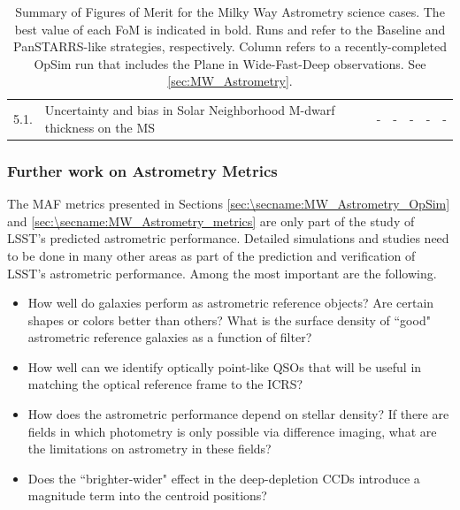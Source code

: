 \begin{table}
\begin{tabular}{l|p{4.8cm}|p{1.1cm}|p{1.1cm}|p{1.1cm}|c|p{3.5cm}}
    5.1. & \footnotesize{Uncertainty and bias in Solar Neighborhood M-dwarf thickness on the MS}  & - & - & - & - &  - \\
\end{tabular}
\caption{Summary of Figures of Merit for the Milky Way Astrometry science cases. The best value of each FoM is indicated in bold. Runs  and  refer to the Baseline and PanSTARRS-like strategies, respectively. Column  refers to a recently-completed OpSim run that includes the Plane in Wide-Fast-Deep observations. See \autoref{sec:MW_Astrometry}.}
\label{tab_SummaryMWAstrometry}
\end{table}




\subsubsection{Further work on Astrometry Metrics}

The MAF metrics presented in Sections \ref{sec:\secname:MW_Astrometry_OpSim} and \ref{sec:\secname:MW_Astrometry_metrics} are only part of the
study of LSST's predicted astrometric performance.  Detailed simulations
and studies need to be done in many other areas as part of the
prediction and verification of LSST's astrometric performance.  Among
the most important are the following.
\begin{itemize}
\item How well do galaxies perform as astrometric reference objects? Are certain shapes or colors better than others? What is the
surface density of ``good" astrometric reference galaxies as a function of filter?
\item How well can we identify optically point-like QSOs that will be useful in matching the optical reference frame to the ICRS?
\item How does the astrometric performance depend on stellar density? If there are fields in which photometry is only possible via difference imaging, what are the limitations
on astrometry in these fields?
\item Does the ``brighter-wider" effect in the deep-depletion CCDs introduce a magnitude term into the centroid positions?
\end{itemize}

\navigationbar

